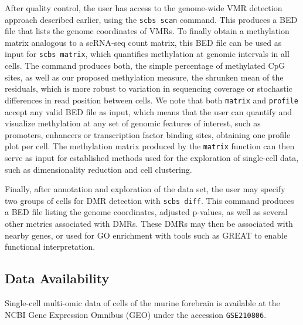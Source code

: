 \documentclass[twocolumn,10pt]{article}
\begin{document}
After quality control, the user has access to the genome-wide VMR detection approach described earlier, using the \texttt{scbs scan} command.
This produces a BED file that lists the genome coordinates of VMRs.
To finally obtain a methylation matrix analogous to a scRNA-seq count matrix, this BED file can be used as input for \texttt{scbs matrix}, which quantifies methylation at genomic intervals in all cells.
The command produces both, the simple percentage of methylated CpG sites, as well as our proposed methylation measure, the shrunken mean of the residuals, which is more robust to variation in sequencing coverage or stochastic differences in read position between cells.
We note that both \texttt{matrix} and \texttt{profile} accept any valid BED file as input, which means that the user can quantify and visualize methylation at any set of genomic features of interest, such as promoters, enhancers or transcription factor binding sites, obtaining one profile plot per cell.
The methylation matrix produced by the \texttt{matrix} function can then serve as input for established methods used for the exploration of single-cell data, such as dimensionality reduction and cell clustering.

Finally, after annotation and exploration of the data set, the user may specify two groups of cells for DMR detection with \texttt{scbs diff}.
This command produces a BED file listing the genome coordinates, adjusted p-values, as well as several other metrics associated with DMRs.
These DMRs may then be associated with nearby genes, or used for GO enrichment with tools such as GREAT \citep{mclean2010great} to enable functional interpretation.


\subsection{Data Availability}

Single-cell multi-omic data of cells of the murine forebrain \citep{kremer_scnmt} is available at the NCBI Gene Expression Omnibus (GEO) under the accession \texttt{GSE210806}.
\end{document}
